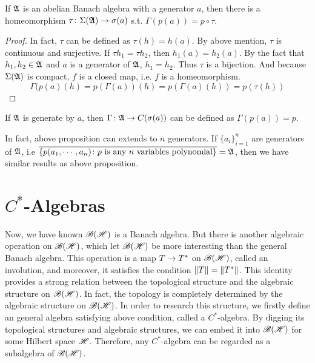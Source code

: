 \begin{prop} \label{prop7}
	If $\mathfrak{A}$ is an abelian Banach algebra with a generator $a$, then there is a homeomorphism $\tau \colon \Sigma(\mathfrak{A}) \rightarrow \sigma(a)$ s.t. $\Gamma(p(a)) = p \circ \tau$.
\end{prop}
\begin{proof}
	In fact, $\tau$ can be defined as $\tau(h)=h(a)$. By above mention, $\tau$ is continuous and surjective. If $\tau{h_1}=\tau{h_2}$, then $ h_1(a) = h_2(a)$. By the fact that $h_1,h_2 \in \mathfrak{A}$ and $a$ is a generator of $\mathfrak{A}$, $h_1=h_2$. Thus $\tau$ is a bijection. And because $\Sigma(\mathfrak{A})$ is compact, $f$ is a closed map, i.e. $f$ is a homeomorphism.
	\begin{equation*}
		\Gamma(p(a)(h) = p(\Gamma(a))(h) = p(\Gamma(a)(h)) = p(\tau(h))
	\end{equation*}
\end{proof}
\begin{rem}
	If $\mathfrak{A}$ is generate by $a$, then $\Gamma \colon \mathfrak{A} \rightarrow C(\sigma(a))$ can be defined as $\Gamma(p(a)) = p$. 
\end{rem}

In fact, above proposition can extends to $n$ generators. If $\{a_i\}_{i=1}^{n}$ are generators of $\mathfrak{A}$, i.e $\overline{\{p(a_1,\cdots,a_n) \colon p \text{ is any } n \text{ variables polynomial}\}} = \mathfrak{A}$, then we have similar results as above proposition.

\section{\texorpdfstring{$C^{*}$-Algebras}{C*-Algebras}}

Now, we have known $\mathscr{B(H)}$ is a Banach algebra. But there is another algebraic operation on $\mathscr{B(H)}$, which let $\mathscr{B(H)}$ be more interesting than the general Banach algebra. This operation is a map $T \rightarrow T^{*}$ on $\mathscr{B(H)}$, called an involution, and moreover, it satisfies the condition $\left\lVert T\right\lVert = \left\lVert T^{*}\right\lVert$. This identity provides a strong relation between the topological structure and the algebraic structure on $\mathscr{B(H)}$. In fact, the topology is completely determined by the algebraic structure on $\mathscr{B(H)}$. In order to research this structure, we firstly define an general algebra satisfying above condition, called a $C^{*}$-algebra. By digging its topological structures and algebraic structures, we can embed it into $\mathscr{B(H)}$ for some Hilbert space $\mathscr{H}$. Therefore, any $C^{*}$-algebra can be regarded as a subalgebra of $\mathscr{B(H)}$.

